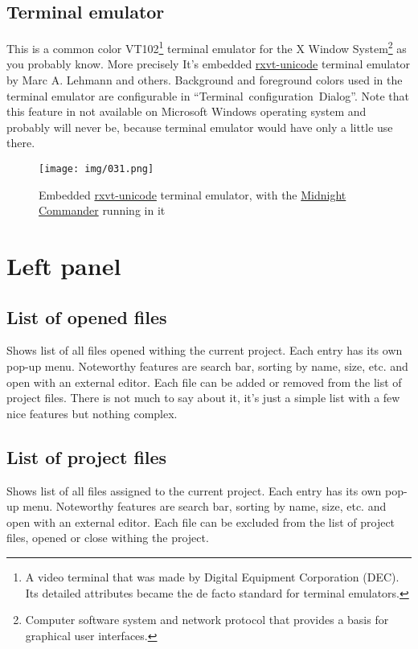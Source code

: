 \documentclass[a4paper,twoside,12pt]{book}
\begin{document}
		\subsection{Terminal emulator}
			This is a common color VT102\footnote{A video terminal that was made by Digital Equipment Corporation (DEC). Its detailed attributes became the de facto standard for terminal emulators.} terminal emulator for the X Window System\footnote{Computer software system and network protocol that provides a basis for graphical user interfaces.} as you probably know. More precisely It's embedded \href{http://software.schmorp.de/pkg/rxvt-unicode.html}{rxvt-unicode} terminal emulator by Marc A. Lehmann and others. Background and foreground colors used in the terminal emulator are configurable in ``Terminal~configuration~Dialog''. Note that this feature in not available on Microsoft\textregistered{} Windows\textregistered{} operating system and probably will never be, because terminal emulator would have only a little use there.
			\begin{figure}[h!]
				\centering{}
				\texttt{[image: img/031.png]}
				\caption{Embedded \href{http://software.schmorp.de/pkg/rxvt-unicode.html}{rxvt-unicode} terminal emulator, with the \href{http://www.midnight-commander.org/}{Midnight Commander} running in it}
			\end{figure}

	\section{Left panel}
		\subsection{List of opened files}
			Shows list of all files opened withing the current project. Each entry has its own pop-up menu. Noteworthy features are search bar, sorting by name, size, etc. and open with an external editor. Each file can be added or removed from the list of project files. There is not much to say about it, it's just a simple list with a few nice features but nothing complex.

		\subsection{List of project files}
			Shows list of all files assigned to the current project. Each entry has its own pop-up menu. Noteworthy features are search bar, sorting by name, size, etc.  and open with an external editor. Each file can be excluded from the list of project files, opened or close withing the project.
\end{document}
